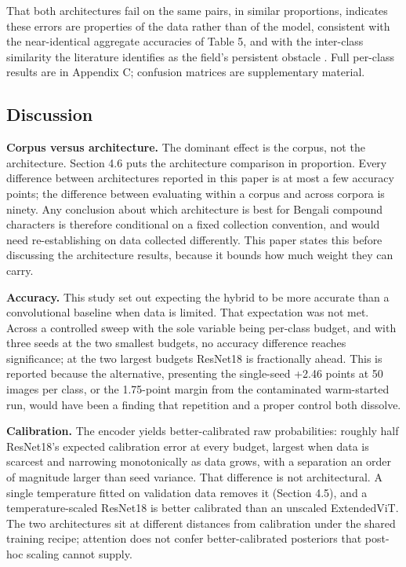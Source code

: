 That both architectures fail on the same pairs, in similar proportions,
indicates these errors are properties of the data rather than of the
model, consistent with the near-identical aggregate accuracies of
Table 5, and with the inter-class similarity the literature identifies
as the field's persistent obstacle \citep{ref17,ref23,ref32}. Full
per-class results are in Appendix C; confusion matrices are
supplementary material.


\hypertarget{discussion}{%
\subsection{Discussion}\label{discussion}}

\textbf{Corpus versus architecture.} The dominant effect is the corpus, not the architecture.
Section 4.6 puts the architecture comparison in proportion. Every
difference between architectures reported in this paper is at most a few
accuracy points; the difference between evaluating within a corpus and
across corpora is ninety. Any conclusion about which architecture is
best for Bengali compound characters is therefore conditional on a fixed
collection convention, and would need re-establishing on data collected
differently. This paper states this before discussing the architecture results,
because it bounds how much weight they can carry.

\textbf{Accuracy.} This study set out expecting the hybrid to be more accurate than a convolutional baseline
when data is limited. That expectation was not met. Across a controlled sweep with the sole
variable being per-class budget, and with three seeds at the two
smallest budgets, no accuracy difference reaches significance; at the
two largest budgets ResNet18 is fractionally ahead. This is reported
because the alternative, presenting the single-seed +2.46 points at
50 images per class, or the 1.75-point margin from the contaminated
warm-started run, would have been a finding that repetition and a
proper control both dissolve.

\textbf{Calibration.} The encoder yields better-calibrated raw probabilities: roughly half ResNet18's expected calibration error at every budget, largest when data is scarcest and narrowing monotonically as data grows, with a separation an order of magnitude larger than seed variance. That difference is not architectural. A single temperature fitted on validation data removes it (Section 4.5), and a temperature-scaled ResNet18 is better calibrated than an unscaled ExtendedViT. The two architectures sit at different distances from calibration under the shared training recipe; attention does not confer better-calibrated posteriors that post-hoc scaling cannot supply.

